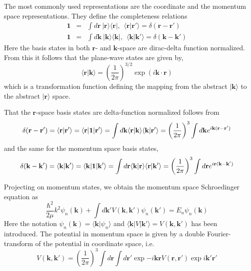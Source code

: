 \documentclass[%
oneside,                 %
final,                   %
10pt]{article}
\begin{document}
The most commonly used representations are the coordinate and
the momentum space representations. They define the completeness relations 
\begin{eqnarray*}
 \mathbf{1}&=&  \int d\mathbf{r} \:\vert\mathbf{r} \rangle \langle \mathbf{r}\vert, \:\: \langle  \mathbf{r}\vert  \mathbf{r'} \rangle = \delta ( \mathbf{r}-\mathbf{r'}) \\
\mathbf{1} &=& \int d\mathbf{k} \:\vert  \mathbf{k}\rangle \langle \mathbf{k}\vert, \:\: \langle\mathbf{k}\vert  \mathbf{k'} \rangle = \delta ( \mathbf{k}-\mathbf{k'}) 
\end{eqnarray*}
Here the basis states in  both $\mathbf{r}$- and $\mathbf{k}$-space are dirac-delta 
function normalized. From this it follows that the plane-wave states are given by,
\[
\langle\mathbf{r}\vert\mathbf{k} \rangle =\left(\frac{1}{2\pi}\right)^{3/2}\exp\left(i\mathbf{k\cdot r} \right)
\]
which is a transformation function defining the mapping from the abstract 
$\vert\mathbf{k}\rangle$ to the abstract $\vert\mathbf{r}\rangle $ space.

That the $\mathbf{r}$-space basis states are 
delta-function normalized follows from 
\[
\delta ( \mathbf{r}-\mathbf{r'}) = \langle \mathbf{r} \vert \mathbf{r}'\rangle = \langle \mathbf{r} \vert \mathbf{1} \vert \mathbf{r}'\rangle = \int d\mathbf{k} \langle \mathbf{r}\vert \mathbf{k} \rangle \langle \mathbf{k}\vert \mathbf{r}' \rangle =\left( {1\over 2\pi}\right)^3 \int d\mathbf{k} e^{i \mathbf{k}(\mathbf{r} - \mathbf{r}')} 
\]
and the same for the momentum space basis states,
\[
\delta ( \mathbf{k}-\mathbf{k'}) = \langle \mathbf{k} \vert \mathbf{k}'\rangle = \langle \mathbf{k} \vert \mathbf{1} \vert \mathbf{k}'\rangle =\int d\mathbf{r} \langle \mathbf{k}\vert \mathbf{r} \rangle \langle \mathbf{r}\vert \mathbf{k}' \rangle = \left( {1\over 2\pi}\right)^3 \int d\mathbf{r} e^{i \mathbf{r}(\mathbf{k} - \mathbf{k}')} 
\]

Projecting  on momentum states, we obtain the momentum space Schroedinger equation as
\begin{equation}
\frac{\hbar^2}{2\mu}k^2\psi_n(\mathbf{k})+\int d\mathbf{k'}V(\mathbf{k}, \mathbf{k'}) \psi_n(\mathbf{k'})=E_n \psi_n(\mathbf{k})
\label{eq:momspace1}
\end{equation}
Here the notation $\psi_n(\mathbf{k}) =\langle\mathbf{k}\vert\psi_n\rangle $ and 
$\langle\mathbf{k}\vert V\vert\mathbf{k}' \rangle =V(\mathbf{k}, \mathbf{k'})$ has been introduced.
The potential in momentum space is given by a double Fourier-transform 
of the potential in coordinate space, i.e.
\[ 
V(\mathbf{k},\mathbf{k'}) = \left( \frac{1}{2\pi}\right)^3\int d\mathbf{r}\int d\mathbf{r}'\exp{-i\mathbf{kr}}V(\mathbf{r},\mathbf{r}')\exp{i\mathbf{k}'\mathbf{r}'}  
\]
\end{document}
